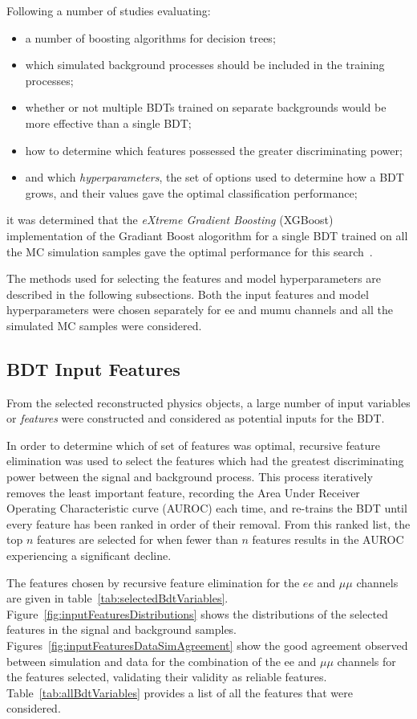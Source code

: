 Following a number of studies evaluating:

\begin{itemize}
\item a number of boosting algorithms for decision trees;
\item which simulated background processes should be included in the training processes;
\item whether or not multiple BDTs trained on separate backgrounds would be more effective than a single BDT;
\item how to determine which features possessed the greater discriminating power;
\item and which \emph{hyperparameters}, the set of options used to determine how a BDT grows, and their values gave the optimal classification performance;
\end{itemize}

it was determined that the \emph{eXtreme Gradient Boosting} (XGBoost) implementation of the Gradiant Boost alogorithm for a single BDT trained on all the MC simulation samples gave the optimal performance for this search~\cite{xgboost}.

The methods used for selecting the features and model hyperparameters are described in the following subsections.
Both the input features and model hyperparameters were chosen separately for ee and mumu channels and all the simulated MC samples were considered.

\subsection{BDT Input Features}
From the selected reconstructed physics objects, a large number of input variables or \emph{features} were constructed and considered as potential inputs for the BDT.

In order to determine which of set of features was optimal, recursive feature elimination was used to select the features which had the greatest discriminating power between the signal and background process.
This process iteratively removes the least important feature, recording the Area Under Receiver Operating Characteristic curve (AUROC) each time, and re-trains the BDT until every feature has been ranked in order of their removal.
From this ranked list, the top $n$ features are selected for when fewer than $n$ features results in the AUROC experiencing a significant decline.
 
The features chosen by recursive feature elimination for the $ee$ and $\mu\mu$ channels are given in table~\ref{tab:selectedBdtVariables}.
Figure~\ref{fig:inputFeaturesDistributions} shows the distributions of the selected features in the signal and background samples.
Figures~\ref{fig:inputFeaturesDataSimAgreement} show the good agreement observed between simulation and data for the combination of the ee and $\mu\mu$ channels for the features selected, validating their validity as reliable features.
Table~\ref{tab:allBdtVariables} provides a list of all the features that were considered.

